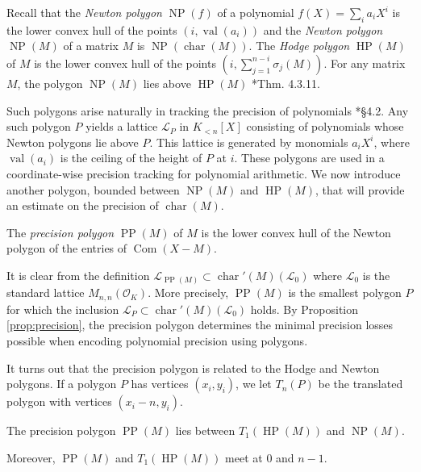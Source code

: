 \documentclass{sig-alternate-2013}
\DeclareMathOperator{\NP}{NP}
\DeclareMathOperator{\HP}{HP}
\DeclareMathOperator{\PP}{PP}
\DeclareMathOperator{\val}{val}
\DeclareMathOperator{\com}{Com}
\newcommand{\OK}{\mathcal{O}_K}
\DeclareMathOperator{\charpoly}{char}
\newcommand{\charp}{\charpoly'}
\begin{document}
Recall that the \emph{Newton polygon} $\NP(f)$ of a polynomial $f(X) = 
\sum_{i} a_i X^i$ is the lower convex hull of the points $(i, 
\val(a_i))$ and the \emph{Newton polygon} $\NP(M)$ of a matrix $M$ is 
$\NP(\charpoly(M))$.  The \emph{Hodge polygon} $\HP(M)$ of $M$ is the lower 
convex hull of the points $(i, \sum_{j = 1}^{n-i} \sigma_j(M))$. For 
any matrix $M$, the polygon $\NP(M)$ lies above $\HP(M)$ 
\cite{kedlaya:padicDiffEq}*{Thm. 4.3.11}.

Such polygons arise naturally in tracking the precision of polynomials 
\cite{caruso-roe-vaccon:14a}*{\S 4.2}.  Any such polygon $P$ yields a 
lattice $\mathcal{L}_P$ in $K_{<n}[X]$ consisting of polynomials whose 
Newton polygons lie above $P$.  This lattice is generated by monomials 
$a_iX^i$, where $\val(a_i)$ is the ceiling of the height of $P$ at $i$.  
These polygons are used in a coordinate-wise precision tracking for polynomial
arithmetic. We now introduce another polygon, bounded 
between $\NP(M)$ and $\HP(M)$, that will provide an estimate on the precision of $\charpoly(M)$.

\begin{deftn}
The \emph{precision polygon} $\PP(M)$ of $M$ is the lower convex hull of 
the Newton polygon of the entries of $\com(X{-}M)$.
\end{deftn}

It is clear from the definition $\mathcal L_{\PP(M)} \subset 
\charp(M)(\mathcal{L}_0)$ where $\mathcal{L}_0$ is the standard lattice 
$M_{n,n}(\OK)$. More precisely, $\PP(M)$ is the smallest polygon $P$ for 
which the inclusion $\mathcal L_P \subset \charp(M)(\mathcal{L}_0)$ holds. By 
Proposition \ref{prop:precision}, the precision polygon determines the minimal 
precision losses possible when encoding polynomial precision using polygons.

It turns out that the precision polygon is related to the Hodge and Newton 
polygons. If a polygon $P$ has vertices $(x_i, y_i)$, we let $T_n(P)$ be 
the translated polygon with vertices $(x_i - n, y_i)$.

\begin{prop} \label{prop:polygons}
The precision polygon $\PP(M)$ lies between $T_1(\HP(M))$
and $\NP(M)$.

Moreover, $\PP(M)$ and $T_1(\HP(M))$ meet at $0$ and $n{-}1$.
\end{prop}
\end{document}
